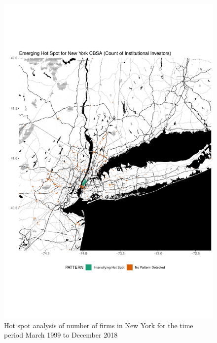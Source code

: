 \begin{figure}
	\centering
	\includegraphics[width=1\linewidth]{Figures/ChapterIV/NY_Count_EH}
	\caption[Hot Spot Analysis of Number of Firms in New York CBSA 1999-2018]{Hot spot analysis of number of firms in New York for the time period March 1999 to December 2018}
	\label{fig:NYCcounthotspot}
\end{figure}


